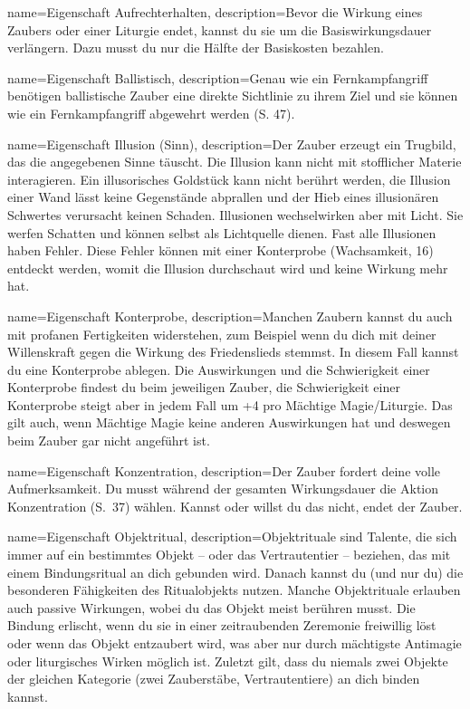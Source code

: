 {
    name={Eigenschaft Aufrechterhalten},
    description={Bevor die Wirkung eines Zaubers oder einer Liturgie endet, kannst du sie um die Basiswirkungsdauer verlängern. Dazu musst du nur die Hälfte der Basiskosten bezahlen.}
}


{
    name={Eigenschaft Ballistisch},
    description={Genau wie ein Fernkampfangriff benötigen ballistische Zauber eine direkte Sichtlinie zu ihrem Ziel und sie können wie ein Fernkampfangriff abgewehrt werden (S. 47).}
}


{
    name={Eigenschaft Illusion (Sinn)},
    description={Der Zauber erzeugt ein Trugbild, das die angegebenen Sinne täuscht. Die Illusion kann nicht mit stofflicher Materie interagieren. Ein illusorisches Goldstück kann nicht berührt werden, die Illusion einer Wand lässt keine Gegenstände abprallen und der Hieb eines illusionären Schwertes verursacht keinen Schaden. Illusionen wechselwirken aber mit Licht. Sie werfen Schatten und können selbst als Lichtquelle dienen. Fast alle Illusionen haben Fehler. Diese Fehler können mit einer Konterprobe (Wachsamkeit, 16) entdeckt werden, womit die Illusion durchschaut wird und keine Wirkung mehr hat.}
}


{
    name={Eigenschaft Konterprobe},
    description={Manchen Zaubern kannst du auch mit profanen Fertigkeiten widerstehen, zum Beispiel wenn du dich mit deiner Willenskraft gegen die Wirkung des Friedenslieds stemmst. In diesem Fall kannst du eine Konterprobe ablegen. Die Auswirkungen und die Schwierigkeit einer Konterprobe findest du beim jeweiligen Zauber, die Schwierigkeit einer Konterprobe steigt aber in jedem Fall um +4 pro Mächtige Magie/Liturgie. Das gilt auch, wenn Mächtige Magie keine anderen Auswirkungen hat und deswegen beim Zauber gar nicht angeführt ist.}
}


{
    name={Eigenschaft Konzentration},
    description={Der Zauber fordert deine volle Aufmerksamkeit. Du musst während der gesamten Wirkungsdauer die Aktion Konzentration (S. 37) wählen. Kannst oder willst du das nicht, endet der Zauber.}
}


{
    name={Eigenschaft Objektritual},
    description={Objektrituale sind Talente, die sich immer auf ein bestimmtes Objekt – oder das Vertrautentier – beziehen, das mit einem Bindungsritual an dich gebunden wird. Danach kannst du (und nur du) die besonderen Fähigkeiten des Ritualobjekts nutzen. Manche Objektrituale erlauben auch passive Wirkungen, wobei du das Objekt meist berühren musst. Die Bindung erlischt, wenn du sie in einer zeitraubenden Zeremonie freiwillig löst oder wenn das Objekt entzaubert wird, was aber nur durch mächtigste Antimagie oder liturgisches Wirken möglich ist. Zuletzt gilt, dass du niemals zwei Objekte der gleichen Kategorie (zwei Zauberstäbe, Vertrautentiere) an dich binden kannst.}
}


